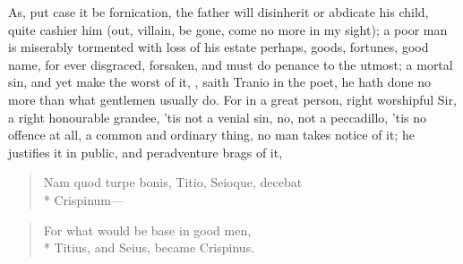{As, put case it be fornication, the father will disinherit or abdicate
his child, quite cashier him (out, villain, be gone, come no more in my
sight); a poor man is miserably tormented with loss of his estate
perhaps, goods, fortunes, good name, for ever disgraced, forsaken, and
must do penance to the utmost; a mortal sin, and yet make the worst of
it, , saith Tranio in the poet,  he hath done no more than what gentlemen
usually do.  For in a great person, right worshipful Sir, a right honourable
grandee, 'tis not a venial sin, no, not a peccadillo, 'tis no offence
at all, a common and ordinary thing, no man takes notice of it; he
justifies it in public, and peradventure brags of it,

\begin{verse}
\textlatin{Nam quod turpe bonis, Titio, Seioque, decebat}\\*
\textlatin{Crispinum}---
\end{verse}

\begin{verse}
For what would be base in good men,\\*
Titius, and Seius, became Crispinus.
\end{verse}

}
